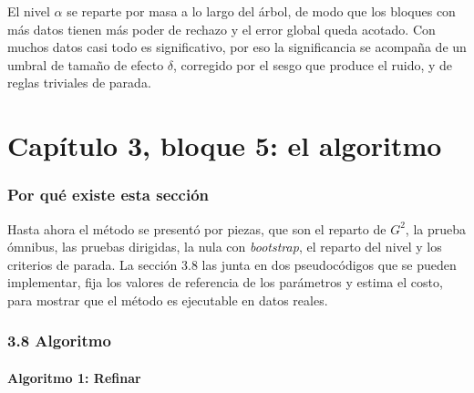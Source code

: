 \documentclass[11pt,a4paper]{article}
\newenvironment{idea}{\par\begin{center}\begin{lrbox}{\ideabox}\begin{minipage}{0.9\linewidth}}{\end{minipage}\end{lrbox}\fcolorbox{blue!40!black}{blue!5}{\usebox{\ideabox}}\end{center}}
\begin{document}
\begin{idea}
El nivel $\alpha$ se reparte por masa a lo largo del árbol, de modo que los bloques con
más datos tienen más poder de rechazo y el error global queda acotado. Con muchos
datos casi todo es significativo, por eso la significancia se acompaña de un umbral de
tamaño de efecto $\delta$, corregido por el sesgo que produce el ruido, y de reglas
triviales de parada.
\end{idea}

\part{Capítulo 3, bloque 5: el algoritmo}

\section{Por qué existe esta sección}

Hasta ahora el método se presentó por piezas, que son el reparto de $G^2$, la prueba
ómnibus, las pruebas dirigidas, la nula con \emph{bootstrap}, el reparto del nivel y
los criterios de parada. La sección 3.8 las junta en dos pseudocódigos que se pueden
implementar, fija los valores de referencia de los parámetros y estima el costo, para
mostrar que el método es ejecutable en datos reales.

\section{3.8 Algoritmo}

\subsection{Algoritmo 1: Refinar}
\end{document}

